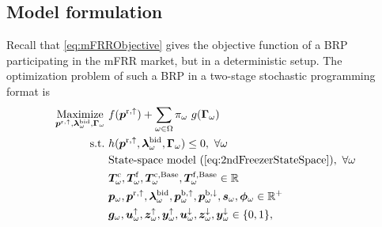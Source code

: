 \subsection{Model formulation}
Recall that \eqref{eq:mFRRObjective} gives the objective function of a BRP participating in the mFRR market, but in a deterministic setup.  The optimization problem of such a BRP in a two-stage stochastic programming format is
%
\begin{subequations}\label{P1:compact_model}
    \begin{align}
        \underset{\bm{p}^{\rm{r},\uparrow}, \bm{\lambda}_{\omega}^{\rm{bid}}, \bm{\Gamma}_{\omega}}{\text{Maximize}} \ & f(\bm{p}^{\rm{r},\uparrow}) + \sum_{\omega \in \Omega} \pi_{\omega} \ g(\bm{\Gamma}_{\omega}) \label{P1:eq1}
        \\
        \text{s.t.} \                                                                                            & h(\bm{p}^{\rm{r},\uparrow}, \bm{\lambda}_{\omega}^{\rm{bid}}, \bm{\Gamma}_{\omega}) \leq 0, \ \forall{\omega}\label{P1:eq2}                                                                                             \\
        \                                                                                                        & \text{State-space model } (\ref{eq:2ndFreezerStateSpace}), \ \forall{\omega} \label{P1:eq3}
        \\
        \                                                                                                        & \bm{T}_{\omega}^{\rm{c}}, \bm{T}_{\omega}^{\rm{f}},  \bm{T}_{\omega}^{\rm{c,\text{Base}}}, \bm{T}_{\omega}^{\rm{f,\text{Base}}}\in \mathbb{R}  \label{P1:eq4}
        \\
                \                                                                                                        & \bm{p}_{\omega}, \bm{p}^{\rm{r},\uparrow}, \bm{\lambda}_{\omega}^{\rm{bid}}, \bm{p}_{\omega}^{\rm{b},\uparrow}, \bm{p}_{\omega}^{\rm{b},\downarrow}, \bm{s}_{\omega},  \bm{\phi}_{\omega}\in \mathbb{R}^{+}  \label{P1:eq5}
        \\
        \                                                                                                        & \bm{g}_{\omega}, \bm{u}^{\uparrow}_{\omega}, \bm{z}^{\uparrow}_{\omega}, \bm{y}^{\uparrow}_{\omega}, \bm{u}^{\downarrow}_{\omega}, \bm{z}^{\downarrow}_{\omega}, \bm{y}^{\downarrow}_{\omega} \in \{0,1\},  \label{P1:eq6}
    \end{align}
\end{subequations}
